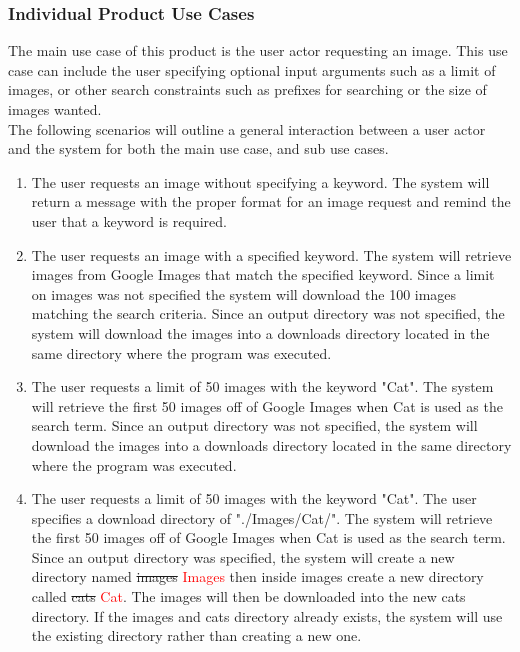 \documentclass[12pt, titlepage]{article}
\begin{document}
\subsubsection{Individual Product Use Cases}

The main use case of this product is the user actor requesting an image. This use case can include the user specifying optional input arguments such as a limit of images, or other search constraints such as prefixes for searching or the size of images wanted.\\

\noindent The following scenarios will outline a general interaction between a user actor and the system for both the main use case, and sub use cases. 

\begin{enumerate}[label=Scenario \arabic*:, wide=0pt, leftmargin=*]
    \item The user requests an image without specifying a keyword. The system will return a message with the proper format for an image request and remind the user that a keyword is required.
    
    \item The user requests an image with a specified keyword. The system will retrieve images from Google Images that match the specified keyword. Since a limit on images was not specified the system will download the 100 images matching the search criteria. Since an output directory was not specified, the system will download the images into a downloads directory located in the same directory where the program was executed.
    
    \item The user requests a limit of 50 images with the keyword "Cat". The system will retrieve the first 50 images off of Google Images when Cat is used as the search term. Since an output directory was not specified, the system will download the images into a downloads directory located in the same directory where the program was executed.
    
    \item The user requests a limit of 50 images with the keyword "Cat". The user specifies a download directory of "./Images/Cat/". The system will retrieve the first 50 images off of Google Images when Cat is used as the search term. Since an output directory was specified, the system will create a new directory named \st{images} \textcolor{red}{Images} then inside images create a new directory called \st{cats} \textcolor{red}{Cat}. The images will then be downloaded into the new cats directory. If the images and cats directory already exists, the system will use the existing directory rather than creating a new one.
    

\end{enumerate}
\end{document}
